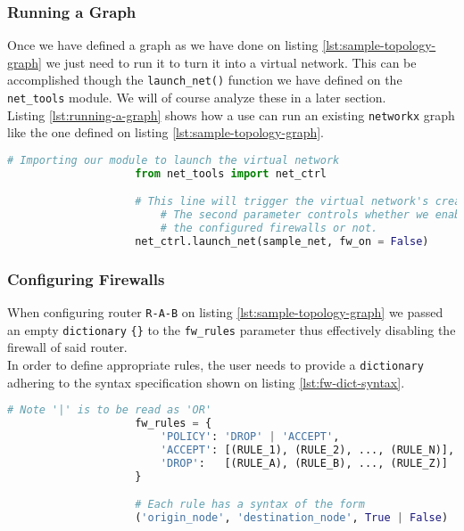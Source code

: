             \subsubsection{Running a Graph}
                Once we have defined a graph as we have done on listing \ref{lst:sample-topology-graph} we just need to run it to turn it into a virtual network. This can be accomplished though the \texttt{launch\_net()} function we have defined on the \texttt{net\_tools} module. We will of course analyze these in a later section.\\

                Listing \ref{lst:running-a-graph} shows how a use can run an existing \texttt{networkx} graph like the one defined on listing \ref{lst:sample-topology-graph}.\\

                \begin{lstlisting}[language = python, caption = Turning a graph into a virtual network., label = lst:running-a-graph]
                    # Importing our module to launch the virtual network
                    from net_tools import net_ctrl

                    # This line will trigger the virtual network's creation.
                        # The second parameter controls whether we enable
                        # the configured firewalls or not.
                    net_ctrl.launch_net(sample_net, fw_on = False)
                \end{lstlisting}

            \subsubsection{Configuring Firewalls} \label{sec:fw-rules}
                When configuring router \texttt{R-A-B} on listing \ref{lst:sample-topology-graph} we passed an empty \texttt{dictionary} \texttt{\{\}} to the \texttt{fw\_rules} parameter thus effectively disabling the firewall of said router.\\

                In order to define appropriate rules, the user needs to provide a \texttt{dictionary} adhering to the syntax specification shown on listing \ref{lst:fw-dict-syntax}.\\

                \begin{lstlisting}[language = python, caption = Syntax for specifying firewall rules., label = lst:fw-dict-syntax]
                    # Note '|' is to be read as 'OR'
                    fw_rules = {
                        'POLICY': 'DROP' | 'ACCEPT',
                        'ACCEPT': [(RULE_1), (RULE_2), ..., (RULE_N)],
                        'DROP':   [(RULE_A), (RULE_B), ..., (RULE_Z)]
                    }

                    # Each rule has a syntax of the form
                    ('origin_node', 'destination_node', True | False)
                \end{lstlisting}

